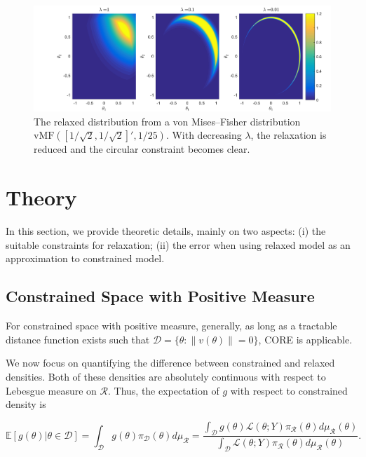 \documentclass[10pt,fleqn]{article} \pdfoutput=1
\newcommand{\bb}[1]{\mathbb{#1}} \newcommand{\mc}[1]{\mathcal{#1}}
\DeclareMathOperator{\1}{\mathbbm{1}} \DeclareMathOperator{\bigO}{\mc O}
\begin{document}
\begin{figure}[H]
\begin{center}
\includegraphics[width=1\textwidth]{Bivariate_Normal_Unit_Circle_Constraint}
\caption{The relaxed distribution from a von Mises--Fisher
distribution $\mbox{vMF}(
[1/\sqrt{2},1/\sqrt{2}]',1/25)$. With decreasing
$\lambda$, the relaxation is reduced and the circular
constraint becomes clear.}
\label{FIG:Bivariate_Normal_Unit_Circle_Constraint}
\end{center}
\end{figure}

\section{Theory}

In this section, we provide theoretic details, mainly on two aspects: (i)
the suitable constraints for relaxation; (ii) the error when using relaxed
model as an approximation to constrained model.

\subsection{Constrained
Space with Positive Measure } \label{SEC:Positive_measure_theory}

For constrained space with positive measure, generally, as long
as a tractable distance function exists such that $\mc D=\{\theta:
\|v(\theta)\|=0\}$, CORE is applicable.

We now focus on quantifying the difference between constrained and
relaxed densities.  Both of these densities are absolutely continuous
with respect to Lebesgue
measure on $\mathcal{R}$.  Thus, the expectation of $g$ with respect to
constrained density is

\begin{equation}
\label{EQ:Expectation_Positive_Measure_Constraint} \bb
E[g(\theta)|\theta\in\mathcal{D}] = \int_\mathcal{D}
g(\theta)\pi_\mathcal{D}(\theta)d\mu_\mathcal{R} =
\frac{\int_\mathcal{D} g(\theta)\mathcal{L}(\theta; Y)
\pi_\mathcal{R}(\theta)d\mu_\mathcal{R}(\theta)}{\int_\mathcal{D}
\mathcal{L}(\theta; Y)
\pi_\mathcal{R}(\theta)d\mu_\mathcal{R}(\theta)}.
\end{equation}
\end{document}
